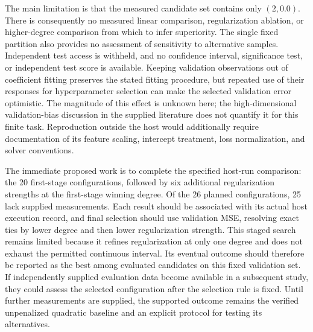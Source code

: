 \documentclass[11pt]{article}
\begin{document}
The main limitation is that the measured candidate set contains only \((2,0.0)\). There is consequently no measured linear comparison, regularization ablation, or higher-degree comparison from which to infer superiority. The single fixed partition also provides no assessment of sensitivity to alternative samples. Independent test access is withheld, and no confidence interval, significance test, or independent test score is available. Keeping validation observations out of coefficient fitting preserves the stated fitting procedure, but repeated use of their responses for hyperparameter selection can make the selected validation error optimistic. The magnitude of this effect is unknown here; the high-dimensional validation-bias discussion in the supplied literature does not quantify it for this finite task. Reproduction outside the host would additionally require documentation of its feature scaling, intercept treatment, loss normalization, and solver conventions.

The immediate proposed work is to complete the specified host-run comparison: the 20 first-stage configurations, followed by six additional regularization strengths at the first-stage winning degree. Of the 26 planned configurations, 25 lack supplied measurements. Each result should be associated with its actual host execution record, and final selection should use validation MSE, resolving exact ties by lower degree and then lower regularization strength. This staged search remains limited because it refines regularization at only one degree and does not exhaust the permitted continuous interval. Its eventual outcome should therefore be reported as the best among evaluated candidates on this fixed validation set. If independently supplied evaluation data become available in a subsequent study, they could assess the selected configuration after the selection rule is fixed. Until further measurements are supplied, the supported outcome remains the verified unpenalized quadratic baseline and an explicit protocol for testing its alternatives.
\end{document}
